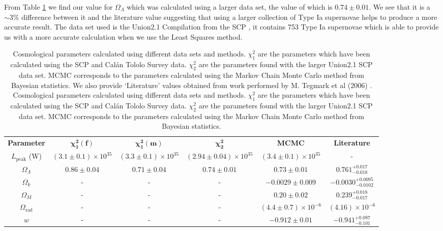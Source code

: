 \documentclass[twocolumn]{revtex4}
\begin{document}
From Table \ref{table:cosmo_parameters} we find our value for $\Omega_\Lambda$ which was calculated using a larger data set, the value of which is $0.74\pm0.01$. We see that it is a $\sim 3\%$ difference between it and the literature value suggesting that using a larger collection of Type Ia supernovae helps to produce a more accurate result. The data set used is the Union2.1 Compilation from the SCP \cite{dataset_2}, it contains 753 Type Ia supernovae which is able to provide us with a more accurate calculation when we use the Least Squares method.

{\renewcommand{\arraystretch}{1.2}%
\begin{table}[t]
\centering
\begin{tabular}{c@{\hskip 15pt}c@{\hskip 15pt}c@{\hskip 15pt}c@{\hskip 15pt}c@{\hskip 15pt}c} 
 \hline
 \textbf{Parameter} & \textbf{$\boldsymbol{\chi^2_{1}(f)}$} & \textbf{$\boldsymbol{\chi^2_{1}(m)}$} & \textbf{$\boldsymbol{\chi^2_2}$} & \textbf{MCMC} & \textbf{Literature} \\ [0.5ex] 
 $L_{\text{peak}}$ (W) & $(3.1\pm0.1)\times 10^{35}$ & $(3.3\pm0.1)\times 10^{35}$ & $(2.94\pm0.04)\times 10^{35}$ & $(3.4\pm0.1 ) \times 10^{35}$ & -\\
 $\Omega_\Lambda$ & $0.86\pm0.04$ &  $0.71\pm0.04$ & $0.74\pm0.01$ & $0.73\pm0.01$ & $0.761^{+0.017}_{-0.018}$ \\
 $\Omega_k$ & - & - & - & $-0.0029\pm0.009$ & $-0.0030^{+0.0095}_{-0.0102}$ \\
 $\Omega_M$ & - & - & - & $0.20\pm0.02$ & $0.239^{+0.018}_{-0.017}$ \\
 $\Omega_\text{rad}$ & - & - & - & $(4.4\pm0.7)\times10^{-6}$ & $(4.16)\times10^{-6}$ \\
 $w$ & - & - & - & $-0.912\pm0.01$ & $-0.941^{+0.087}_{-0.101}$ \\
 \hline
\end{tabular}
\caption{Cosmological parameters calculated using different data sets and methods. $\chi^2_1$ are the parameters which have been calculated using the SCP and Cal\'{a}n Tololo Survey data. $\chi^2_2$ are the parameters found with the larger Union2.1 SCP data set. MCMC corresponds to the parameters calculated using the Markov Chain Monte Carlo method from Bayesian statistics. We also provide `Literature' values obtained from work performed by M. Tegmark et al (2006) \cite{cosmo_constraints}. 
Cosmological parameters calculated using different data sets and methods. $\chi^2_1$ are the parameters which have been calculated using the SCP and Cal\'{a}n Tololo Survey data. $\chi^2_2$ are the parameters found with the larger Union2.1 SCP data set. MCMC corresponds to the parameters calculated using the Markov Chain Monte Carlo method from Bayesian statistics. }
\vspace{-0.5em}
\label{table:cosmo_parameters}
\end{table}

}
\end{document}
